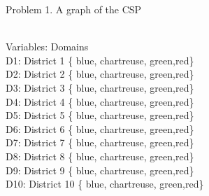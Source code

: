 \documentclass{article}
\begin{document}
Problem 1.
A graph of the CSP 
\vspace{10mm}

\\
Variables:      Domains\\
D1: District 1 \left\{ {blue, chartreuse, green,red}\right\} \\
D2: District 2 \left\{ {blue, chartreuse, green,red}\right\} \\
D3: District 3 \left\{ {blue, chartreuse, green,red}\right\} \\
D4: District 4 \left\{ {blue, chartreuse, green,red}\right\} \\
D5: District 5 \left\{ {blue, chartreuse, green,red}\right\} \\
D6: District 6 \left\{ {blue, chartreuse, green,red}\right\} \\
D7: District 7 \left\{ {blue, chartreuse, green,red}\right\} \\
D8: District 8 \left\{ {blue, chartreuse, green,red}\right\} \\
D9: District 9 \left\{ {blue, chartreuse, green,red}\right\} \\
D10: District 10 \left\{ {blue, chartreuse, green,red}\right\} \\
\end{document}
